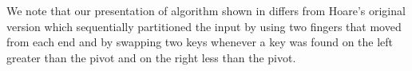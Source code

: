 {\begin{remark}
We note that our presentation of \qsort{} algorithm shown in
 differs from Hoare's original version which
sequentially partitioned the input by using two fingers that moved
from each end and by swapping two keys whenever a key was found on the
left greater than the pivot and on the right less than the pivot.

\end{remark}

\begin{comment}

\section{Lower Bounds}

After spending time formulating a concrete problem, we might wonder how hard the
problem actually is.   In this book thus far, our focus has been on obtaining
efficient algorithms for certain problems.  For a problem $P$, we try to design
efficient algorithms to solve it.  The existence of an algorithm gives an upper
bound on the complexity of the problem $P$.  In particular, an algorithm $A$
with work (either expected or worst-case) $O(f(n))$ is a constructive proof that
$P$ can be solved provided $O(f(n))$ work.  This is essentially the upper bound
part of the question.


In this lecture, we'll turn the tables, showing that certain problems cannot be
solved more efficiently than a given bound.  This is the lower bound part of the
question.  In general, this is a harder task: To establish a lower bound, we
have to argue that \emph{no algorithm, however smart, can possibly do better
  than what we claim}; it is no longer sufficient to exhibit an algorithm $A$
and analyze its performance.

\subsection{Sorting and Merging Lower Bounds}

Before we look at lower bounds for sorting and merging, let us review the
(upper) bounds we have for various sorting algorithms we've covered:


\end{comment}}
